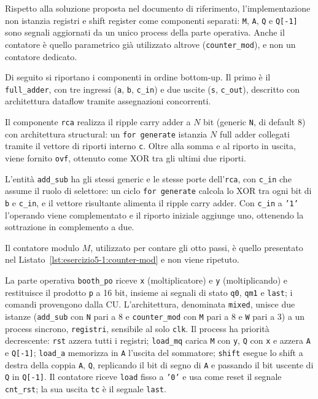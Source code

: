 Rispetto alla soluzione proposta nel documento di riferimento, l'implementazione non istanzia registri e shift register come componenti separati: \texttt{M}, \texttt{A}, \texttt{Q} e \texttt{Q[-1]} sono segnali aggiornati da un unico process della parte operativa. Anche il contatore è quello parametrico già utilizzato altrove (\texttt{counter\_mod}), e non un contatore dedicato.

\implementazione

Di seguito si riportano i componenti in ordine bottom-up. Il primo è il \texttt{full\_adder}, con tre ingressi (\texttt{a}, \texttt{b}, \texttt{c\_in}) e due uscite (\texttt{s}, \texttt{c\_out}), descritto con architettura dataflow tramite assegnazioni concorrenti.


Il componente \texttt{rca} realizza il ripple carry adder a $N$ bit (generic \texttt{N}, di default 8) con architettura structural: un \texttt{for generate} istanzia $N$ full adder collegati tramite il vettore di riporti interno \texttt{c}. Oltre alla somma e al riporto in uscita, viene fornito \texttt{ovf}, ottenuto come XOR tra gli ultimi due riporti.


L'entità \texttt{add\_sub} ha gli stessi generic e le stesse porte dell'\texttt{rca}, con \texttt{c\_in} che assume il ruolo di selettore: un ciclo \texttt{for generate} calcola lo XOR tra ogni bit di \texttt{b} e \texttt{c\_in}, e il vettore risultante alimenta il ripple carry adder. Con \texttt{c\_in} a \texttt{'1'} l'operando viene complementato e il riporto iniziale aggiunge uno, ottenendo la sottrazione in complemento a due.


Il contatore modulo $M$, utilizzato per contare gli otto passi, è quello presentato nel Listato~\ref{lst:esercizio5-1:counter-mod} e non viene ripetuto.

La parte operativa \texttt{booth\_po} riceve \texttt{x} (moltiplicatore) e \texttt{y} (moltiplicando) e restituisce il prodotto \texttt{p} a 16 bit, insieme ai segnali di stato \texttt{q0}, \texttt{qm1} e \texttt{last}; i comandi provengono dalla CU. L'architettura, denominata \texttt{mixed}, unisce due istanze (\texttt{add\_sub} con \texttt{N} pari a 8 e \texttt{counter\_mod} con \texttt{M} pari a 8 e \texttt{W} pari a 3) a un process sincrono, \texttt{registri}, sensibile al solo \texttt{clk}. Il process ha priorità decrescente: \texttt{rst} azzera tutti i registri; \texttt{load\_mq} carica \texttt{M} con \texttt{y}, \texttt{Q} con \texttt{x} e azzera \texttt{A} e \texttt{Q[-1]}; \texttt{load\_a} memorizza in \texttt{A} l'uscita del sommatore; \texttt{shift} esegue lo shift a destra della coppia \texttt{A}, \texttt{Q}, replicando il bit di segno di \texttt{A} e passando il bit uscente di \texttt{Q} in \texttt{Q[-1]}. Il contatore riceve \texttt{load} fisso a \texttt{'0'} e usa come reset il segnale \texttt{cnt\_rst}; la sua uscita \texttt{tc} è il segnale \texttt{last}.


